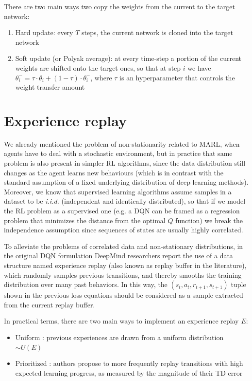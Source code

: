 \documentclass[a4paper,10pt]{report}
\begin{document}
There are two main ways two copy the weights from the current to the target network:
\begin{enumerate}
	\item Hard update: every $T$ steps, the current network is cloned into the target network
	\item Soft update (or Polyak average): at every time-step a portion of the current weights are shifted onto the target ones, so that at step $i$ we have $\theta_i^{-}=\tau \cdot \theta_i + (1-\tau)\cdot \theta_i^{-}$, where $\tau$ is an hyperparameter that controls the weight transfer amount 
\end{enumerate}

\section{Experience replay}
We already mentioned the problem of non-stationarity related to MARL, when agents have to deal with a stochastic environment, but in practice that same problem is also present in simpler RL algorithms, since the data distribution still changes as the agent learns new behaviours (which is in contrast with the standard assumption of a fixed underlying distribution of deep learning methods). Moreover, we know that supervised learning algorithms assume samples in a dataset to be \textit{i.i.d.} (independent and identically distributed), so that if we model the RL problem as a supervised one (e.g. a DQN can be framed as a regression problem that minimizes the distance from the optimal $Q$ function) we break the independence assumption since sequences of states are usually highly correlated. 

To alleviate the problems of correlated data and non-stationary distributions, in the original DQN formulation \cite{atari-dqn} DeepMind researchers report the use of a data structure named experience replay (also known as replay buffer in the literature), which randomly samples previous transitions, and thereby smooths the training distribution over many past behaviors. In this way, the $(s_t, a_t, r_{t+1}, s_{t+1})$ tuple shown in the previous loss equations should be considered as a sample extracted from the current replay buffer.

In practical terms, there are two main ways to implement an experience replay $E$:
\begin{itemize}
	\item Uniform \cite{atari-dqn}: previous experiences are drawn from a uniform distribution $\sim U(E)$
	\item Prioritized \cite{per}: authors propose to more frequently replay transitions with high expected learning progress, as measured by the magnitude of their TD error
\end{itemize}
\end{document}
